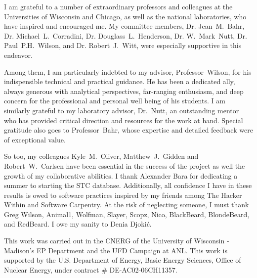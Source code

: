 I am grateful to a number of extraordinary professors and colleagues at the 
Universities of Wisconsin and Chicago, as well as the national laboratories, 
who have inspired and encouraged me. My committee members, Dr. Jean~M.~Bahr, Dr.  
Michael~L.~Corradini, Dr. Douglass~L.~Henderson, Dr. W.~Mark~Nutt, Dr.  
Paul~P.H.~Wilson, and Dr. Robert~J.~Witt, were especially supportive in this 
endeavor.  

Among them, I am particularly indebted to my advisor, Professor~Wilson, 
for his indispensible technical and practical guidance. He has been a dedicated 
ally, always generous with analytical perspectives, far-ranging enthusiasm, 
and deep concern for the professional and personal well being of his students. 
I am similarly grateful to my laboratory advisor, Dr.~Nutt, an 
outstanding mentor who has provided critical direction and resources for the 
work at hand. Special gratitude also goes to Professor~Bahr, whose 
expertise and detailed feedback were of exceptional value.  

So too, my colleagues Kyle~M.~Oliver, Matthew~J.~Gidden and Robert~W.~Carlsen 
have been essential in the success of the \Cyclus project as well the growth of 
my collaborative abilities. I thank Alexander Bara for dedicating a summer to 
starting the STC database. Additionally, all confidence I have in 
these results is owed to software practices inspired by my friends among The 
Hacker Within and Software Carpentry. At the risk of neglecting someone, I must 
thank Greg Wilson, Animal1, Wolfman, Slayer, Scopz, Nico,  BlackBeard, 
BlondeBeard, and RedBeard. I owe my sanity to Denia Djoki\'{c}.

This work was carried out in the \gls{CNERG} of the University of Wisconsin - 
Madison's \gls{EP} Department and the \gls{UFD} Campaign at \gls{ANL}. This 
work is supported by the U.S. Department of Energy, Basic Energy Sciences, 
Office of Nuclear Energy, under contract \# DE-AC02-06CH11357.
